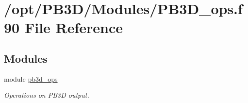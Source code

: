 \hypertarget{PB3D__ops_8f90}{}\section{/opt/\+P\+B3\+D/\+Modules/\+P\+B3\+D\+\_\+ops.f90 File Reference}
\label{PB3D__ops_8f90}
\subsection*{Modules}
\begin{DoxyCompactItemize}
\item 
module \hyperlink{namespacepb3d__ops}{pb3d\+\_\+ops}
\begin{DoxyCompactList}\small\item\em Operations on P\+B3D output. \end{DoxyCompactList}\end{DoxyCompactItemize}
